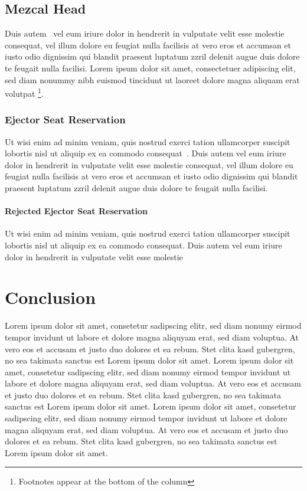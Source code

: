 \documentclass[journal]{vgtc}                %
\begin{document}
\subsection{Mezcal Head}

Duis autem~\cite{Lorensen:1987:MCA} vel eum iriure dolor in hendrerit
in vulputate velit esse molestie consequat, vel illum dolore eu
feugiat nulla facilisis at vero eros et accumsan et iusto odio
dignissim qui blandit praesent luptatum zzril delenit augue duis
dolore te feugait nulla facilisi. Lorem ipsum dolor sit amet,
consectetuer adipiscing elit, sed diam nonummy nibh euismod tincidunt
ut laoreet dolore magna aliquam erat volutpat%
\footnote{Footnotes appear at the bottom of the column}.


\subsubsection{Ejector Seat Reservation}

Ut wisi enim ad minim veniam, quis nostrud exerci tation ullamcorper
suscipit lobortis nisl ut aliquip ex ea commodo
consequat~\cite{Nielson:1991:TAD}. Duis autem vel eum iriure dolor in
hendrerit in vulputate velit esse molestie consequat, vel illum dolore
eu feugiat nulla facilisis at vero eros et accumsan et iusto odio
dignissim qui blandit praesent luptatum zzril delenit augue duis
dolore te feugait nulla facilisi.

\paragraph{Rejected Ejector Seat Reservation}

Ut wisi enim ad minim veniam, quis nostrud exerci tation ullamcorper
suscipit lobortis nisl ut aliquip ex ea commodo consequat. Duis autem
vel eum iriure dolor in hendrerit in vulputate velit esse molestie

\section{Conclusion}

Lorem ipsum dolor sit amet, consetetur sadipscing elitr, sed diam
nonumy eirmod tempor invidunt ut labore et dolore magna aliquyam erat,
sed diam voluptua. At vero eos et accusam et justo duo dolores et ea
rebum. Stet clita kasd gubergren, no sea takimata sanctus est Lorem
ipsum dolor sit amet. Lorem ipsum dolor sit amet, consetetur
sadipscing elitr, sed diam nonumy eirmod tempor invidunt ut labore et
dolore magna aliquyam erat, sed diam voluptua. At vero eos et accusam
et justo duo dolores et ea rebum. Stet clita kasd gubergren, no sea
takimata sanctus est Lorem ipsum dolor sit amet. Lorem ipsum dolor sit
amet, consetetur sadipscing elitr, sed diam nonumy eirmod tempor
invidunt ut labore et dolore magna aliquyam erat, sed diam
voluptua. At vero eos et accusam et justo duo dolores et ea
rebum. Stet clita kasd gubergren, no sea takimata sanctus est Lorem
ipsum dolor sit amet.
\end{document}
